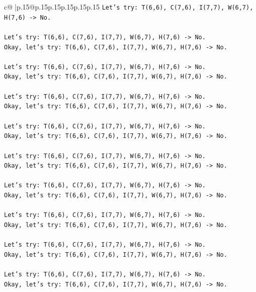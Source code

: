 \documentclass{article}
\begin{document}
{\begin{supertabular}{c@{$\;$}|p{.15\linewidth}@{}p{.15\linewidth}p{.15\linewidth}p{.15\linewidth}p{.15\linewidth}p{.15\linewidth}}
{{{\texttt{Let's try: T(6,6), C(7,6), I(7,7), W(6,7), H(7,6) {-}> No.} \\
\\ 
\texttt{Let's try: T(6,6), C(7,6), I(7,7), W(6,7), H(7,6) {-}> No.} \\
\texttt{Okay, let's try: T(6,6), C(7,6), I(7,7), W(6,7), H(7,6) {-}> No.} \\
\\ 
\texttt{Let's try: T(6,6), C(7,6), I(7,7), W(6,7), H(7,6) {-}> No.} \\
\texttt{Okay, let's try: T(6,6), C(7,6), I(7,7), W(6,7), H(7,6) {-}> No.} \\
\\ 
\texttt{Let's try: T(6,6), C(7,6), I(7,7), W(6,7), H(7,6) {-}> No.} \\
\texttt{Okay, let's try: T(6,6), C(7,6), I(7,7), W(6,7), H(7,6) {-}> No.} \\
\\ 
\texttt{Let's try: T(6,6), C(7,6), I(7,7), W(6,7), H(7,6) {-}> No.} \\
\texttt{Okay, let's try: T(6,6), C(7,6), I(7,7), W(6,7), H(7,6) {-}> No.} \\
\\ 
\texttt{Let's try: T(6,6), C(7,6), I(7,7), W(6,7), H(7,6) {-}> No.} \\
\texttt{Okay, let's try: T(6,6), C(7,6), I(7,7), W(6,7), H(7,6) {-}> No.} \\
\\ 
\texttt{Let's try: T(6,6), C(7,6), I(7,7), W(6,7), H(7,6) {-}> No.} \\
\texttt{Okay, let's try: T(6,6), C(7,6), I(7,7), W(6,7), H(7,6) {-}> No.} \\
\\ 
\texttt{Let's try: T(6,6), C(7,6), I(7,7), W(6,7), H(7,6) {-}> No.} \\
\texttt{Okay, let's try: T(6,6), C(7,6), I(7,7), W(6,7), H(7,6) {-}> No.} \\
\\ 
\texttt{Let's try: T(6,6), C(7,6), I(7,7), W(6,7), H(7,6) {-}> No.} \\
\texttt{Okay, let's try: T(6,6), C(7,6), I(7,7), W(6,7), H(7,6) {-}> No.} \\
\\ 
\texttt{Let's try: T(6,6), C(7,6), I(7,7), W(6,7), H(7,6) {-}> No.} \\
\texttt{Okay, let's try: T(6,6), C(7,6), I(7,7), W(6,7), H(7,6) {-}> No.} \\
\\ 
}}}
\end{supertabular}}
\end{document}
